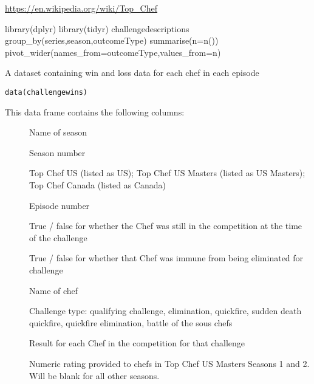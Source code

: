 \documentclass[a4paper]{book}
\begin{document}
%
\begin{Source}
\url{https://en.wikipedia.org/wiki/Top_Chef}
\end{Source}
%
\begin{Examples}
\begin{ExampleCode}
library(dplyr)
library(tidyr)
challengedescriptions %
   group_by(series,season,outcomeType) %
   summarise(n=n()) %
   pivot_wider(names_from=outcomeType,values_from=n)
\end{ExampleCode}
\end{Examples}
%
\begin{Description}
A dataset containing win and loss data for each chef in each episode
\end{Description}
%
\begin{Usage}
\begin{verbatim}
data(challengewins)
\end{verbatim}
\end{Usage}
%
\begin{Format}
This data frame contains the following columns:
\begin{description}

\item[] Name of season
\item[] Season number
\item[] Top Chef US (listed as US); Top Chef US Masters
(listed as US Masters); Top Chef Canada (listed
as Canada)
\item[] Episode number
\item[] True / false for whether the Chef was still
in the competition at the time of the
challenge
\item[] True / false for whether that Chef was immune from
being eliminated for challenge
\item[] Name of chef
\item[] Challenge type: qualifying challenge,
elimination, quickfire, sudden death quickfire,
quickfire elimination, battle of the sous
chefs
\item[] Result for each Chef in the competition for that
challenge
\item[] Numeric rating provided to chefs in Top Chef US
Masters Seasons 1 and 2. Will be blank for all
other seasons.

\end{description}

\end{Format}
\end{document}
